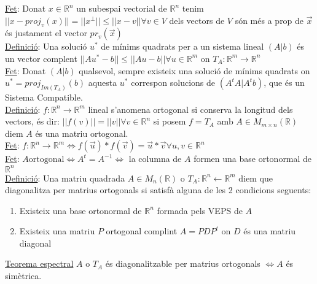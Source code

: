 \documentclass[../main.tex]{subfiles}
\begin{document}
    \underline{Fet}: Donat $x \in \mathbb{R}^n$ un subespai vectorial de $\mathbb{R}^n$ tenim $||x-proj_v(x)|| = ||x^\perp||\leq ||x-v|| \forall v \in V$ dels vectors de $V$ són més a prop de $\Vec{x}$ és justament el vector $pr_v(\Vec{x})$\\
    \underline{Definició}: Una solució $u^*$ de mínims quadrats per a un sistema lineal $(A|b)$ és un vector complent $||Au^*-b|| \leq ||Au-b|| \forall u \in \mathbb{R}^m$ on $T_A: \mathbb{R}^m \rightarrow \mathbb{R}^n$\\
    \underline{Fet}: Donat $(A|b)$ qualsevol, sempre existeix una solució de mínims quadrats on $u^* = proj_{Im(T_A)}(b)$ aquesta $u^*$ correspon solucions de $(A^tA|A^tb)$, que és un Sistema Compatible.\\
    \underline{Definició}: $f: \mathbb{R}^n \rightarrow \mathbb{R}^m$ lineal s'anomena ortogonal si conserva la longitud dels vectors, és dir: $||f(v)||=||v|| \forall v \in \mathbb{R}^n$ si posem $f=T_A$ amb $A \in M_{m\times n}(\mathbb{R})$ diem $A$ és una matriu ortogonal.\\
    \underline{Fet}: $f: \mathbb{R}^n \rightarrow \mathbb{R}^m \Leftrightarrow f(\vec{u})*f(\vec{v}) = \vec{u}*\vec{v} \forall u, v \in \mathbb{R}^n$ \\
    \underline{Fet}: $A \text{ortogonal} \Leftrightarrow A^t=A^{-1} \Leftrightarrow$ la columna de $A$ formen una base ortonormal de $\mathbb{R}^n$\\
    \underline{Definició}: Una matriu quadrada $A \in M_n(\mathbb{R})$ o $T_A: \mathbb{R}^n \leftarrow \mathbb{R}^m$ diem que diagonalitza per matrius ortogonals si satisfà alguna de les 2 condicions seguents:
    \begin{enumerate}
        \item Existeix una base ortonormal de $\mathbb{R}^n$ formada pels VEPS de $A$
        \item Existeix una matriu $P$ ortogonal complint $A=PDP^t$ on $D$ és una matriu diagonal
    \end{enumerate}
    \underline{Teorema espectral} $A$ o $T_A$ és diagonalitzable per matrius ortogonals $\Leftrightarrow A$ és simètrica.
\end{document}
